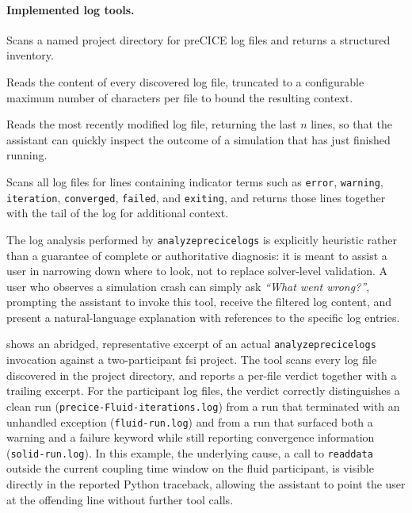 \documentclass[
  numbers=noenddot,
  english,
  a4paper,
  twoside,
  bibliography=totoc,
  headsepline,
  cleardoublepage=empty,
  parskip=half,
  draft=false
]{scrbook}
\theoremstyle{break}
\renewcommand{\_}{\textunderscore\allowbreak}
\begin{document}
\paragraph{Implemented log tools.}

\begin{description}[font=\ttfamily]
  \item[list\_project\_logs] Scans a named project directory for preCICE log files and returns
        a structured inventory.
  \item[read\_project\_logs] Reads the content of every discovered log file, truncated to a
        configurable maximum number of characters per file to bound the resulting context.
  \item[read\_latest\_log] Reads the most recently modified log file, returning the last $n$
        lines, so that the assistant can quickly inspect the outcome of a simulation that has
        just finished running.
  \item[analyze\_precice\_logs] Scans all log files for lines containing indicator terms such
        as \texttt{error}, \texttt{warning}, \texttt{iteration}, \texttt{converged},
        \texttt{failed}, and \texttt{exiting}, and returns those lines together with the tail
        of the log for additional context.
\end{description}

The log analysis performed by \texttt{analyze\_precice\_logs} is explicitly heuristic rather
than a guarantee of complete or authoritative diagnosis: it is meant to assist a user in
narrowing down where to look, not to replace solver-level validation.
A user who observes a simulation crash can simply ask \emph{``What went wrong?''}, prompting
the assistant to invoke this tool, receive the filtered log content, and present a
natural-language explanation with references to the specific log entries.

 shows an abridged, representative excerpt of an actual
\texttt{analyze\_precice\_logs} invocation against a two-participant \gls{fsi} project.
The tool scans every log file discovered in the project directory, and reports a per-file verdict together with a
trailing excerpt.
For the participant log files, the verdict correctly distinguishes a clean run
(\texttt{precice-Fluid-iterations.log}) from a run that terminated with an unhandled exception
(\texttt{fluid-run.log}) and from a run that surfaced both a warning and a failure keyword
while still reporting convergence information (\texttt{solid-run.log}).
In this example, the underlying cause, a call to \texttt{read\_data} outside the current
coupling time window on the fluid participant, is visible directly in the reported Python
traceback, allowing the assistant to point the user at the offending line without further
tool calls.
\end{document}
